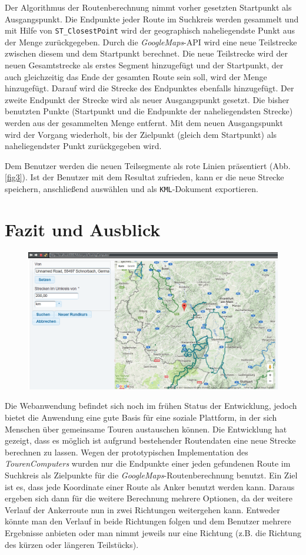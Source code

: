 \documentclass[a4paper,11pt,utf8]{scrartcl}
\begin{document}
Der Algorithmus der Routenberechnung nimmt vorher gesetzten Startpunkt als Ausgangspunkt. Die Endpunkte jeder Route im Suchkreis werden gesammelt und mit Hilfe von \texttt{ST\_ClosestPoint} wird der geographisch naheliegendste Punkt aus der Menge zurückgegeben. Durch die \textit{GoogleMaps}-API wird eine neue Teilstrecke zwischen diesem und dem Startpunkt berechnet. Die neue Teilstrecke wird der neuen Gesamtstrecke als erstes Segment hinzugefügt und der Startpunkt, der auch gleichzeitig das Ende der gesamten Route sein soll, wird der Menge hinzugefügt. Darauf wird die Strecke des Endpunktes ebenfalls hinzugefügt. Der zweite Endpunkt der Strecke wird als neuer Ausgangspunkt gesetzt. Die bisher benutzten Punkte (Startpunkt und die Endpunkte der naheliegendsten Strecke) werden aus der gesammelten Menge entfernt. Mit dem neuen Ausgangspunkt wird der Vorgang wiederholt, bis der Zielpunkt (gleich dem Startpunkt) als naheliegendster Punkt zurückgegeben wird.

Dem Benutzer werden die neuen Teilsegmente als rote Linien präsentiert (Abb. \ref{fig3}). Ist der Benutzer mit dem Resultat zufrieden, kann er die neue Strecke speichern, anschließend auswählen und als \texttt{KML}-Dokument exportieren.

\section{Fazit und Ausblick}
\begin{figure}[htb]
        \centering
        \includegraphics[width=.75\linewidth]{pics/index.PNG}
\end{figure}
Die Webanwendung befindet sich noch im frühen Status der Entwicklung, jedoch bietet die Anwendung eine gute Basis für eine soziale Plattform, in der sich Menschen über gemeinsame Touren austauschen können. Die Entwicklung hat gezeigt, dass es möglich ist aufgrund bestehender Routendaten eine neue Strecke berechnen zu lassen. Wegen der prototypischen Implementation des \textit{TourenComputers} wurden nur die Endpunkte einer jeden gefundenen Route im Suchkreis als Zielpunkte für die \textit{GoogleMaps}-Routenberechnung benutzt. Ein Ziel ist es, dass jede Koordinate einer Route als Anker benutzt werden kann. Daraus ergeben sich dann für die weitere Berechnung mehrere Optionen, da der weitere Verlauf der Ankerroute nun in zwei Richtungen weitergehen kann. Entweder könnte man den Verlauf in beide Richtungen folgen und dem Benutzer mehrere Ergebnisse anbieten oder man nimmt jeweils nur eine Richtung (z.B. die Richtung des kürzen oder längeren Teilstücks).
\end{document}
